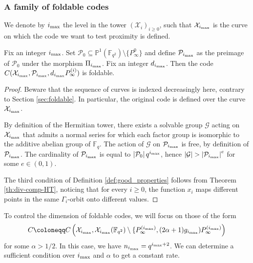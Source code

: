 \documentclass[10pt,a4paper]{article}
\newcommand\F{\mathbb{F}}
\newcommand\Fq{\mathbb{F}_q}
\newcommand\PP{\mathbb{P}}
\newcommand{\size}[1]{\left|#1\right|}
\newcommand\calX{\mathcal{X}}
\newcommand\calP{\mathcal{P}}
\newcommand\calG{\mathcal{G}}
\newcommand\mydef{\coloneqq}
\newcommand{\ii}{i_{\rm{max}}}
\theoremstyle{plain}
\theoremstyle{plain}
\theoremstyle{definition}
\theoremstyle{remark}
\theoremstyle{plain}
\begin{document}
\subsubsection{A family of foldable codes}\label{subsec:foldable-towers-codes}

We denote by $\ii$ the level in the tower $(\calX_i)_{i\geq 0}$, such that $\calX_{\ii}$ is the curve on which the code we want to test proximity is defined. 


\begin{proposition}\label{prop:tower-family}
	Fix an integer $\ii$. Set $\calP_{0} \subseteq \PP^1(\F_{q^2})\setminus\{P^{0}_\infty\}$ and define $\calP_{\ii}$ as the preimage of $\calP_0$ under the morphism $\Pi_{\ii}$. Fix an integer $d_{\ii}$. Then the code $C(\calX_{\ii},\calP_{\ii}, d_{\ii}P^{(i)}_{\infty})$ is foldable.
	
	
	
\end{proposition}
\begin{proof}
	Beware that the sequence of curves is indexed decreasingly here, contrary to Section \ref{sec:foldable}. In particular, the original code is defined over the curve $\calX_{\ii}$.
	
	By definition of the Hermitian tower, there exists a solvable group $\calG$ acting on $\calX_{\ii}$ that admits a normal series for which each factor group is isomorphic to the additive abelian group of $\Fq$. The action of $\calG$ on $\calP_{\ii}$ is free, by definition of $\calP_{\ii}$. The cardinality of $\calP_{\ii}$ is equal to $\size{\calP_{0}}q^{\ii}$, hence $\size{\calG} > \size{\calP_{\ii}}^e$ for some $e \in (0,1)$. 
	
	The third condition of Definition \ref{def:good_properties} follows from Theorem \ref{th:div-comp-HT}, noticing that for every $i\geq 0$, the function $x_i$ maps different points in the same $\Gamma_i$-orbit onto different values.
\end{proof}


To control the dimension of foldable codes, we will focus on those of the form
\begin{equation}\label{eq:def_Cimax}
	C \mydef C\left(\calX_{\ii},\calX_{\ii}(\F_{q^2})\setminus \{P^{(\ii)}_{\infty} , (2\alpha+1)g_{\ii})P^{(\ii)}_{\infty}\right)
\end{equation}
for some $\alpha > 1/2$. In this case, we have $n_{\ii}=q^{\ii+2}$. We  can determine a sufficient condition over $\ii$ and $\alpha$ to get a constant rate.
\end{document}
